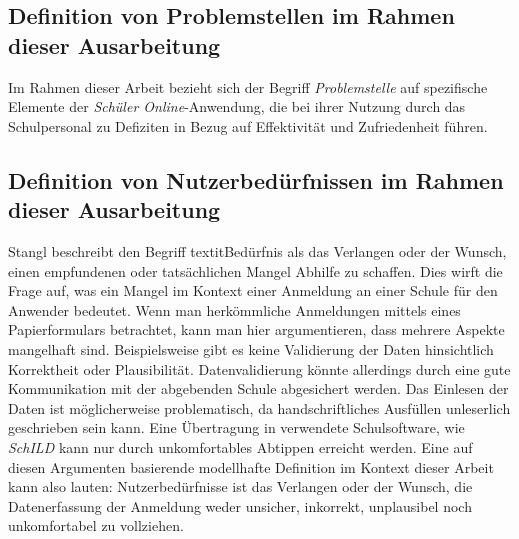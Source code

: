 \subsection{Definition von Problemstellen im Rahmen dieser Ausarbeitung}
Im Rahmen dieser Arbeit bezieht sich der Begriff \textit{Problemstelle} auf spezifische Elemente der \textit{Schüler Online}-Anwendung, die bei ihrer Nutzung durch das Schulpersonal zu Defiziten in Bezug auf Effektivität und Zufriedenheit führen.

\subsection{Definition von Nutzerbedürfnissen im Rahmen dieser Ausarbeitung}
Stangl beschreibt den Begriff textit{Bedürfnis} als \glqq das Verlangen oder der Wunsch, einen empfundenen oder tatsächlichen Mangel Abhilfe zu schaffen.\grqq{}\cite{stangl-beduerfnis} Dies wirft die Frage auf, was ein Mangel im Kontext einer Anmeldung an einer Schule für den Anwender bedeutet. Wenn man herkömmliche Anmeldungen mittels eines Papierformulars betrachtet, kann man hier argumentieren, dass mehrere Aspekte mangelhaft sind. Beispielsweise gibt es keine Validierung der Daten hinsichtlich Korrektheit oder Plausibilität.  Datenvalidierung könnte allerdings durch eine gute Kommunikation mit der abgebenden Schule abgesichert werden. Das Einlesen der Daten ist möglicherweise problematisch, da handschriftliches Ausfüllen unleserlich geschrieben sein kann. Eine Übertragung in verwendete Schulsoftware, wie \textit{SchILD} kann nur durch unkomfortables Abtippen erreicht werden.
Eine auf diesen Argumenten basierende modellhafte Definition im Kontext dieser Arbeit kann also lauten: \glqq Nutzerbedürfnisse ist das Verlangen oder der Wunsch, die Datenerfassung der Anmeldung weder unsicher, inkorrekt, unplausibel noch unkomfortabel zu vollziehen\grqq{}.

